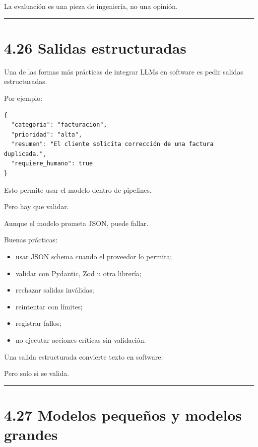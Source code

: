 La evaluación es una pieza de ingeniería, no una opinión.

\begin{center}\rule{0.5\linewidth}{0.5pt}\end{center}

\section{4.26 Salidas estructuradas}\label{salidas-estructuradas}

Una de las formas más prácticas de integrar LLMs en software es pedir
salidas estructuradas.

Por ejemplo:

\begin{lstlisting}
{
  "categoria": "facturacion",
  "prioridad": "alta",
  "resumen": "El cliente solicita corrección de una factura duplicada.",
  "requiere_humano": true
}
\end{lstlisting}

Esto permite usar el modelo dentro de pipelines.

Pero hay que validar.

Aunque el modelo prometa JSON, puede fallar.

Buenas prácticas:

\begin{itemize}
\tightlist
\item
  usar JSON schema cuando el proveedor lo permita;
\item
  validar con Pydantic, Zod u otra librería;
\item
  rechazar salidas inválidas;
\item
  reintentar con límites;
\item
  registrar fallos;
\item
  no ejecutar acciones críticas sin validación.
\end{itemize}

Una salida estructurada convierte texto en software.

Pero solo si se valida.

\begin{center}\rule{0.5\linewidth}{0.5pt}\end{center}

\section{4.27 Modelos pequeños y modelos
grandes}\label{modelos-pequeuxf1os-y-modelos-grandes}

